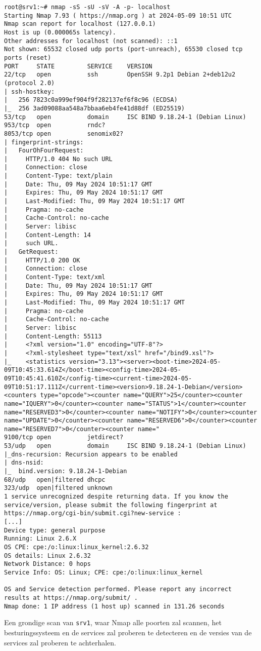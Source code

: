 \begin{longlisting}
  \begin{verbatim}
root@srv1:~# nmap -sS -sU -sV -A -p- localhost
Starting Nmap 7.93 ( https://nmap.org ) at 2024-05-09 10:51 UTC
Nmap scan report for localhost (127.0.0.1)
Host is up (0.000065s latency).
Other addresses for localhost (not scanned): ::1
Not shown: 65532 closed udp ports (port-unreach), 65530 closed tcp ports (reset)
PORT     STATE         SERVICE    VERSION
22/tcp   open          ssh        OpenSSH 9.2p1 Debian 2+deb12u2 (protocol 2.0)
| ssh-hostkey:
|   256 7823c0a999ef904f9f282137ef6f8c96 (ECDSA)
|_  256 3ad09088aa548a7bbaa6eb4fe41d88df (ED25519)
53/tcp   open          domain     ISC BIND 9.18.24-1 (Debian Linux)
953/tcp  open          rndc?
8053/tcp open          senomix02?
| fingerprint-strings:
|   FourOhFourRequest:
|     HTTP/1.0 404 No such URL
|     Connection: close
|     Content-Type: text/plain
|     Date: Thu, 09 May 2024 10:51:17 GMT
|     Expires: Thu, 09 May 2024 10:51:17 GMT
|     Last-Modified: Thu, 09 May 2024 10:51:17 GMT
|     Pragma: no-cache
|     Cache-Control: no-cache
|     Server: libisc
|     Content-Length: 14
|     such URL.
|   GetRequest:
|     HTTP/1.0 200 OK
|     Connection: close
|     Content-Type: text/xml
|     Date: Thu, 09 May 2024 10:51:17 GMT
|     Expires: Thu, 09 May 2024 10:51:17 GMT
|     Last-Modified: Thu, 09 May 2024 10:51:17 GMT
|     Pragma: no-cache
|     Cache-Control: no-cache
|     Server: libisc
|     Content-Length: 55113
|     <?xml version="1.0" encoding="UTF-8"?>
|     <?xml-stylesheet type="text/xsl" href="/bind9.xsl"?>
|_    <statistics version="3.13"><server><boot-time>2024-05-09T10:45:33.614Z</boot-time><config-time>2024-05-09T10:45:41.610Z</config-time><current-time>2024-05-09T10:51:17.111Z</current-time><version>9.18.24-1-Debian</version><counters type="opcode"><counter name="QUERY">25</counter><counter name="IQUERY">0</counter><counter name="STATUS">1</counter><counter name="RESERVED3">0</counter><counter name="NOTIFY">0</counter><counter name="UPDATE">0</counter><counter name="RESERVED6">0</counter><counter name="RESERVED7">0</counter><counter name="
9100/tcp open          jetdirect?
53/udp   open          domain     ISC BIND 9.18.24-1 (Debian Linux)
|_dns-recursion: Recursion appears to be enabled
| dns-nsid:
|_  bind.version: 9.18.24-1-Debian
68/udp   open|filtered dhcpc
323/udp  open|filtered unknown
1 service unrecognized despite returning data. If you know the service/version, please submit the following fingerprint at https://nmap.org/cgi-bin/submit.cgi?new-service :
[...]
Device type: general purpose
Running: Linux 2.6.X
OS CPE: cpe:/o:linux:linux_kernel:2.6.32
OS details: Linux 2.6.32
Network Distance: 0 hops
Service Info: OS: Linux; CPE: cpe:/o:linux:linux_kernel

OS and Service detection performed. Please report any incorrect results at https://nmap.org/submit/ .
Nmap done: 1 IP address (1 host up) scanned in 131.26 seconds
  \end{verbatim}
  \caption{Een grondige scan van \texttt{srv1}, waar Nmap alle poorten zal scannen, het besturingssysteem en de services zal proberen te detecteren en de versies van de services zal proberen te achterhalen.}
  \label{lst:bijlage-nmap-scan}
\end{longlisting}
